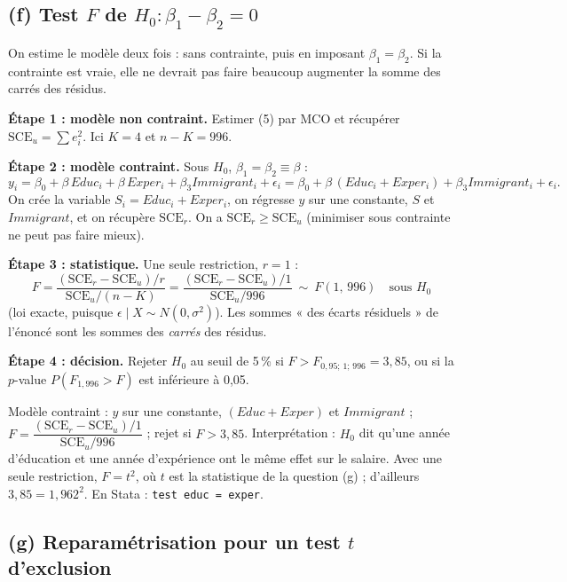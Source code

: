 \documentclass[11pt,a4paper]{article}
\begin{document}
\subsection*{(f) Test $F$ de $H_0:\beta_1-\beta_2=0$}

\begin{idee}
On estime le modèle deux fois : sans contrainte, puis en imposant $\beta_1=\beta_2$. Si la contrainte est vraie, elle ne devrait pas faire beaucoup augmenter la somme des carrés des résidus.
\end{idee}

\textbf{Étape 1 : modèle non contraint.} Estimer (5) par MCO et récupérer $\text{SCE}_u=\sum e_i^2$. Ici $K=4$ et $n-K=996$.

\textbf{Étape 2 : modèle contraint.} Sous $H_0$, $\beta_1=\beta_2\equiv\beta$ :
\[
y_i=\beta_0+\beta\,Educ_i+\beta\,Exper_i+\beta_3Immigrant_i+\epsilon_i=\beta_0+\beta\,(Educ_i+Exper_i)+\beta_3Immigrant_i+\epsilon_i .
\]
On crée la variable $S_i=Educ_i+Exper_i$, on régresse $y$ sur une constante, $S$ et $Immigrant$, et on récupère $\text{SCE}_r$. On a $\text{SCE}_r\ge\text{SCE}_u$ (minimiser sous contrainte ne peut pas faire mieux).

\textbf{Étape 3 : statistique.} Une seule restriction, $r=1$ :
\[
F=\frac{(\text{SCE}_r-\text{SCE}_u)/r}{\text{SCE}_u/(n-K)}=\frac{(\text{SCE}_r-\text{SCE}_u)/1}{\text{SCE}_u/996}\ \sim\ F(1,\,996)\quad\text{sous }H_0
\]
(loi exacte, puisque $\epsilon\mid X\sim N(0,\sigma^2)$). Les sommes « des écarts résiduels » de l'énoncé sont les sommes des \emph{carrés} des résidus.

\textbf{Étape 4 : décision.} Rejeter $H_0$ au seuil de 5\,\% si $F>F_{0{,}95;\,1;\,996}=3{,}85$, ou si la $p$-value $P(F_{1,996}>F)$ est inférieure à 0,05.

\begin{reponse}
Modèle contraint : $y$ sur une constante, $(Educ+Exper)$ et $Immigrant$ ; $F=\dfrac{(\text{SCE}_r-\text{SCE}_u)/1}{\text{SCE}_u/996}$ ; rejet si $F>3{,}85$. Interprétation : $H_0$ dit qu'une année d'éducation et une année d'expérience ont le même effet sur le salaire. Avec une seule restriction, $F=t^2$, où $t$ est la statistique de la question (g) ; d'ailleurs $3{,}85=1{,}962^2$. En Stata : \texttt{test educ = exper}.
\end{reponse}

\subsection*{(g) Reparamétrisation pour un test $t$ d'exclusion}
\end{document}
